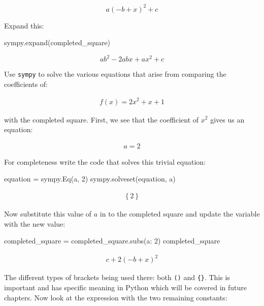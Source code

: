 \[a \left(- b + x\right)^{2} + c\]

Expand this:

\begin{pyin}
sympy.expand(completed_square)
\end{pyin}

\[a b^{2} - 2 a b x + a x^{2} + c\]

Use \texttt{sympy} to solve the various equations that arise from comparing
the coefficients of:

\begin{equation*}
\begin{split}
    f(x) = 2x ^2 + x + 1
\end{split}
\end{equation*}

with the completed square.
First, we see that the coefficient of \(x ^ 2\) gives us an equation:

\begin{equation*}
\begin{split}
    a = 2
\end{split}
\end{equation*}

For completeness write the code that solves this trivial equation:

\begin{pyin}
equation = sympy.Eq(a, 2)
sympy.solveset(equation, a)
\end{pyin}

\begin{equation*}
\begin{split}\displaystyle \left\{2\right\}\end{split}
\end{equation*}

Now substitute this value of \(a\) in to the completed square and update the variable with the new value:

\begin{pyin}
completed_square = completed_square.subs({a: 2})
completed_square
\end{pyin}

\begin{equation*}
\begin{split}\displaystyle c + 2 \left(- b + x\right)^{2}\end{split}
\end{equation*}

The different types of brackets being used there: both \texttt{()} and \texttt{\{\}}. This is
important and has specific meaning in Python which will be covered in future
chapters.
Now look at the expression with the two remaining constants:


